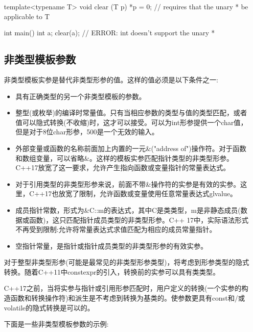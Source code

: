 \begin{cpp}
template<typename T>
void clear (T p)
{
	*p = 0; // requires that the unary * be applicable to T
}

int main()
{
	int a;
	clear(a); // ERROR: int doesn’t support the unary *
}
\end{cpp}

\subsection{非类型模板参数}

非类型模板实参是替代非类型形参的值。这样的值必须是以下条件之一:

\begin{itemize}
\item 
具有正确类型的另一个非类型模板的参数。

\item
整型(或枚举)的编译时常量值。只有当相应参数的类型与值的类型匹配，或者值可以隐式转换(不收缩)时，这才可以接受。可以为int形参提供一个char值，但是对于8位char形参，500是一个无效的输入。

\item 
外部变量或函数的名称前面加上内置的一元\&("address of")操作符。对于函数和数组变量，可以省略\&。这样的模板实参匹配指针类型的非类型形参。C++17放宽了这一要求，允许产生指向函数或变量指针的常量表达式。

\item 
对于引用类型的非类型形参来说，前面不带\&操作符的实参是有效的实参。这里，C++17也放宽了限制，允许函数或变量使用任意常量表达式glvalue。

\item 
成员指针常数，形式为\&C::m的表达式，其中C是类类型，m是非静态成员(数据或函数)，这只匹配指针成员类型的非类型形参。C++ 17中，实际语法形式不再受到限制:允许将常量表达式求值匹配为相应的成员常量指针。

\item 
空指针常量，是指针或指针成员类型的非类型形参的有效实参。
\end{itemize}

对于整型非类型形参(可能是最常见的非类型形参类型)，将考虑到形参类型的隐式转换。随着C++11中constexpr的引入，转换前的实参可以具有类类型。

C++17之前，当将实参与指针或引用形参匹配时，用户定义的转换(一个实参的构造函数和转换操作符)和派生是不考虑到转换为基类的。使参数更具有const和/或volatile的隐式转换是可以的。

下面是一些非类型模板参数的示例:

